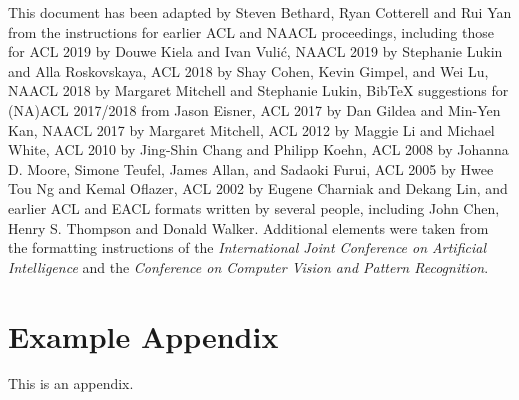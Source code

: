 \documentclass[11pt]{article}
\begin{document}
This document has been adapted
by Steven Bethard, Ryan Cotterell and Rui Yan
from the instructions for earlier ACL and NAACL proceedings, including those for 
ACL 2019 by Douwe Kiela and Ivan Vuli\'{c},
NAACL 2019 by Stephanie Lukin and Alla Roskovskaya, 
ACL 2018 by Shay Cohen, Kevin Gimpel, and Wei Lu, 
NAACL 2018 by Margaret Mitchell and Stephanie Lukin,
Bib\TeX{} suggestions for (NA)ACL 2017/2018 from Jason Eisner,
ACL 2017 by Dan Gildea and Min-Yen Kan, 
NAACL 2017 by Margaret Mitchell, 
ACL 2012 by Maggie Li and Michael White, 
ACL 2010 by Jing-Shin Chang and Philipp Koehn, 
ACL 2008 by Johanna D. Moore, Simone Teufel, James Allan, and Sadaoki Furui, 
ACL 2005 by Hwee Tou Ng and Kemal Oflazer, 
ACL 2002 by Eugene Charniak and Dekang Lin, 
and earlier ACL and EACL formats written by several people, including
John Chen, Henry S. Thompson and Donald Walker.
Additional elements were taken from the formatting instructions of the \emph{International Joint Conference on Artificial Intelligence} and the \emph{Conference on Computer Vision and Pattern Recognition}.



\appendix

\section{Example Appendix}
\label{sec:appendix}

This is an appendix.
\end{document}
